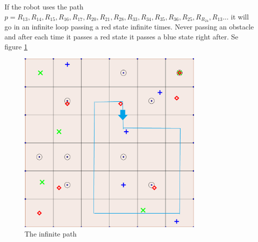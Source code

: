 If the robot uses the path $p=R_{13},R_{14},R_{15},R_{16},R_{17},R_{20},R_{21},R_{28},R_{33},R_{34},R_{35},R_{36},R_{25},R_{R_24},R_{13}...$ it will go in an infinite loop passing a red state infinite times. Never passing an obstacle and after each time it passes a red state it passes a blue state right after. Se figure \ref{inf_path}
\begin{figure}[H]
 \centering
  \includegraphics[width = 0.8\textwidth]{hw3_map_path.png}
  \caption{The infinite path}
  \label{inf_path}
  \end{figure}

